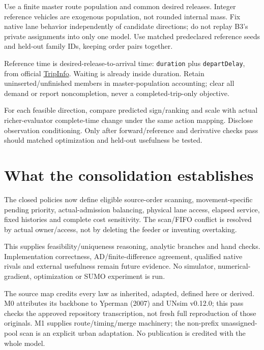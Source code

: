 \documentclass[10pt,a4paper]{article}
\begin{document}
Use a finite master route population and common desired releases.
Integer reference vehicles are exogenous population, not rounded internal
mass. Fix native lane behavior independently of candidate directions;
do not replay B3's private assignments into only one model.
Use matched predeclared reference seeds and held-out family IDs,
keeping order pairs together.

Reference time is desired-release-to-arrival time:
\texttt{duration} plus \texttt{departDelay}, from official
\href{https://sumo.dlr.de/docs/Simulation/Output/TripInfo.html}{TripInfo}.
Waiting is already inside duration. Retain uninserted/unfinished members
in master-population accounting; clear all demand or report noncompletion,
never a completed-trip-only objective.

For each feasible direction, compare predicted sign/ranking and scale
with actual richer-evaluator complete-time change under the same action
mapping. Disclose observation conditioning. Only after forward/reference
and derivative checks pass should matched optimization and held-out
usefulness be tested.

\section{What the consolidation establishes}

The closed policies now define eligible source-order scanning,
movement-specific pending priority, actual-admission balancing,
physical lane access, elapsed service, fixed histories and complete cost
sensitivity. The scan/FIFO conflict is resolved by actual owner/access,
not by deleting the feeder or inventing overtaking.

This supplies feasibility/uniqueness reasoning, analytic branches and
hand checks. Implementation correctness, AD/finite-difference agreement,
qualified native rivals and external usefulness remain future evidence.
No simulator, numerical-gradient, optimization or SUMO experiment is run.

The source map credits every law as inherited, adapted, defined here or
derived. M0 attributes its backbone to Yperman (2007) and UNsim v0.12.0;
this pass checks the approved repository transcription, not fresh full
reproduction of those originals. M1 supplies route/timing/merge machinery;
the non-prefix unassigned-pool scan is an explicit urban adaptation.
No publication is credited with the whole model.
\end{document}
